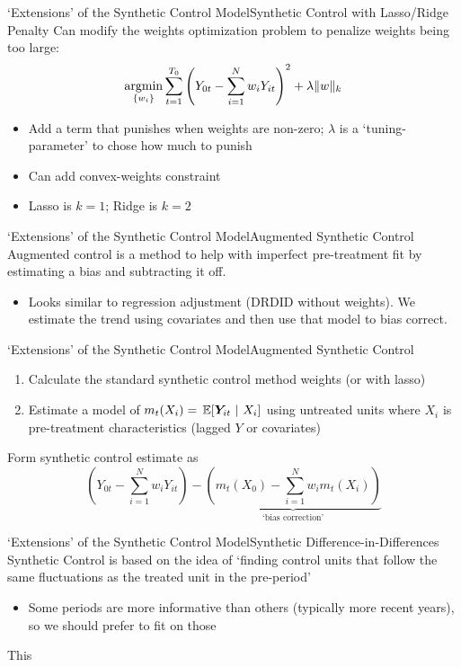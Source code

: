 \documentclass[t]{beamer}
\begin{document}
\begin{frame}{`Extensions' of the Synthetic Control Model}{Synthetic Control with Lasso/Ridge Penalty}
  Can modify the weights optimization problem to penalize weights being too large:
  $$
    \operatorname*{argmin}_{ \{ w_i \} } \sum_{t=1}^{T_0} \left( Y_{0t} - \sum_{i=1}^N w_i Y_{it} \right)^2 + \lambda \| w \|_k
  $$
  \begin{itemize}
    \item Add a term that punishes when weights are non-zero; $\lambda$ is a `tuning-parameter' to chose how much to punish
    \item Can add convex-weights constraint
    \item Lasso is $k = 1$; Ridge is $k = 2$
  \end{itemize}
\end{frame}


\begin{frame}{`Extensions' of the Synthetic Control Model}{Augmented Synthetic Control}
  Augmented control is a method to help with imperfect pre-treatment fit by estimating a bias and subtracting it off.
  \begin{itemize}
    \item Looks similar to regression adjustment (DRDID without weights). We estimate the trend using covariates and then use that model to bias correct.
  \end{itemize}
\end{frame}

\begin{frame}{`Extensions' of the Synthetic Control Model}{Augmented Synthetic Control}
  \begin{enumerate}
    \item Calculate the standard synthetic control method weights (or with lasso)
    \item Estimate a model of $m_{t}(X_i) = \expec{\bm{Y}_{it}}{X_i}$ using untreated units where $X_i$ is pre-treatment characteristics (lagged $Y$ or covariates)
  \end{enumerate}

  \bigskip
  Form synthetic control estimate as
  $$
    \left( Y_{0t} - \sum_{i = 1}^N w_i Y_{it} \right) -
      \underbrace{\left( m_{t}(X_0) - \sum_{i = 1}^N w_i m_t(X_i) \right)}_{\text{`bias correction'}}
  $$
\end{frame}



\begin{frame}{`Extensions' of the Synthetic Control Model}{Synthetic Difference-in-Differences}
  Synthetic Control is based on the idea of `finding control units that follow the same fluctuations as the treated unit in the pre-period'
  \begin{itemize}
    \item Some periods are more informative than others (typically more recent years), so we should prefer to fit on those
  \end{itemize}

  This
\end{frame}
\end{document}
